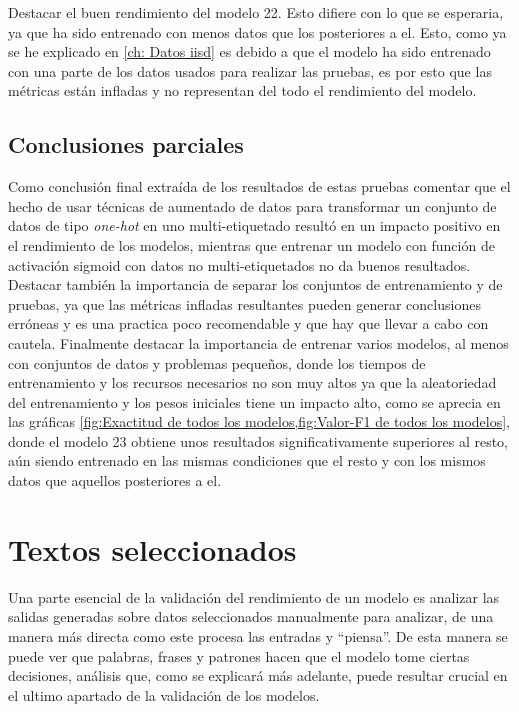 Destacar el buen rendimiento del modelo 22. Esto difiere con lo que se
esperaria, ya que ha sido entrenado con menos datos que los posteriores a el.
Esto, como ya se he explicado en \cref{ch: Datos iisd} es debido a que el modelo
ha sido entrenado con una parte de los datos usados para realizar las pruebas,
es por esto que las métricas están infladas y no representan del todo el
rendimiento del modelo.

\subsection{Conclusiones parciales}
Como conclusión final extraída de los resultados de estas pruebas comentar que
el hecho de usar técnicas de aumentado de datos para transformar un conjunto de
datos de tipo \textit{one-hot} en uno multi-etiquetado resultó en un impacto
positivo en el rendimiento de los modelos, mientras que entrenar un modelo con
función de activación sigmoid con datos no multi-etiquetados no da buenos
resultados. Destacar también la importancia de separar los conjuntos de
entrenamiento y de pruebas, ya que las métricas infladas resultantes pueden
generar conclusiones erróneas y es una practica poco recomendable y que hay que
llevar a cabo con cautela. Finalmente destacar la importancia de entrenar varios
modelos, al menos con conjuntos de datos y problemas pequeños, donde los tiempos
de entrenamiento y los recursos necesarios no son muy altos ya que la
aleatoriedad del entrenamiento y los pesos iniciales tiene un impacto alto, como
se aprecia en las gráficas \cref{fig:Exactitud de todos los modelos,fig:Valor-F1
de todos los modelos}, donde el modelo 23 obtiene unos resultados
significativamente superiores al resto, aún siendo entrenado en las mismas
condiciones que el resto y con los mismos datos que aquellos posteriores a el. 

\section{Textos seleccionados}
Una parte esencial de la validación del rendimiento de un modelo es analizar las
salidas generadas sobre datos seleccionados manualmente para analizar, de una
manera más directa como este procesa las entradas y ``piensa''. De esta manera
se puede ver que palabras, frases y patrones hacen que el modelo tome ciertas
decisiones, análisis que, como se explicará más adelante, puede resultar crucial
en el ultimo apartado de la validación de los modelos.

